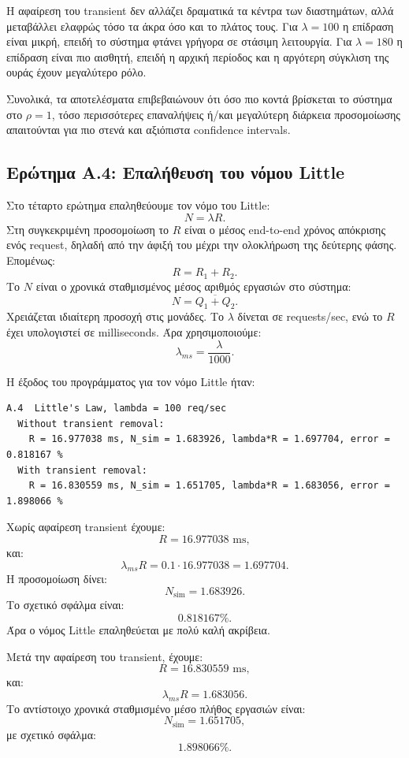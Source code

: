 \documentclass{article}
\begin{document}
Η αφαίρεση του transient δεν αλλάζει δραματικά τα κέντρα των διαστημάτων, αλλά μεταβάλλει ελαφρώς τόσο τα άκρα όσο και το πλάτος τους. Για $\lambda=100$ η επίδραση είναι μικρή, επειδή το σύστημα φτάνει γρήγορα σε στάσιμη λειτουργία. Για $\lambda=180$ η επίδραση είναι πιο αισθητή, επειδή η αρχική περίοδος και η αργότερη σύγκλιση της ουράς έχουν μεγαλύτερο ρόλο.

Συνολικά, τα αποτελέσματα επιβεβαιώνουν ότι όσο πιο κοντά βρίσκεται το σύστημα στο $\rho=1$, τόσο περισσότερες επαναλήψεις ή/και μεγαλύτερη διάρκεια προσομοίωσης απαιτούνται για πιο στενά και αξιόπιστα confidence intervals.

\newpage
\subsection{Ερώτημα A.4: Επαλήθευση του νόμου Little}

Στο τέταρτο ερώτημα επαληθεύουμε τον νόμο του Little:
\[
    N = \lambda R.
\]
Στη συγκεκριμένη προσομοίωση το $R$ είναι ο μέσος end-to-end χρόνος απόκρισης ενός request, δηλαδή από την άφιξή του μέχρι την ολοκλήρωση της δεύτερης φάσης. Επομένως:
\[
    R = R_1 + R_2.
\]
Το $N$ είναι ο χρονικά σταθμισμένος μέσος αριθμός εργασιών στο σύστημα:
\[
    N =
    \overline{Q_1 + Q_2}.
\]
Χρειάζεται ιδιαίτερη προσοχή στις μονάδες. Το $\lambda$ δίνεται σε requests/sec, ενώ το $R$ έχει υπολογιστεί σε milliseconds. Άρα χρησιμοποιούμε:
\[
    \lambda_{ms} = \frac{\lambda}{1000}.
\]

Η έξοδος του προγράμματος για τον νόμο Little ήταν:

\begin{verbatim}
A.4  Little's Law, lambda = 100 req/sec
  Without transient removal:
    R = 16.977038 ms, N_sim = 1.683926, lambda*R = 1.697704, error = 0.818167 %
  With transient removal:
    R = 16.830559 ms, N_sim = 1.651705, lambda*R = 1.683056, error = 1.898066 %
\end{verbatim}

Χωρίς αφαίρεση transient έχουμε:
\[
    R = 16.977038 \text{ ms},
\]
και:
\[
    \lambda_{ms}R
    =
    0.1 \cdot 16.977038
    =
    1.697704.
\]
Η προσομοίωση δίνει:
\[
    N_{\text{sim}} = 1.683926.
\]
Το σχετικό σφάλμα είναι:
\[
    0.818167\%.
\]
Άρα ο νόμος Little επαληθεύεται με πολύ καλή ακρίβεια.

Μετά την αφαίρεση του transient, έχουμε:
\[
    R = 16.830559 \text{ ms},
\]
και:
\[
    \lambda_{ms}R = 1.683056.
\]
Το αντίστοιχο χρονικά σταθμισμένο μέσο πλήθος εργασιών είναι:
\[
    N_{\text{sim}} = 1.651705,
\]
με σχετικό σφάλμα:
\[
    1.898066\%.
\]
\end{document}
